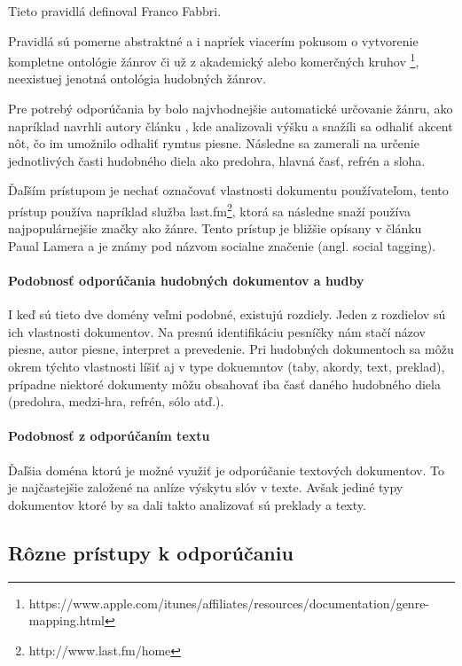Tieto pravidlá definoval Franco Fabbri\cite{music_genres_problematics}.

Pravidlá sú pomerne abstraktné a i napríek viacerím pokusom o vytvorenie
kompletne ontológie žánrov či už z akademický alebo komerčných kruhov
\footnote[2]{https://www.apple.com/itunes/affiliates/resources/documentation/genre-mapping.html},
neexistuej jenotná ontológia hudobných žánrov.

Pre potrebý odporúčania by bolo najvhodnejšie automatické určovanie žánru, ako napríklad 
navrhli autory článku \cite{automatic_genre_recognition}, kde analizovali výšku
a snažíli sa odhaliť akcent nôt, čo im umožnilo odhaliť rymtus piesne. Následne sa zamerali
na určenie jednotlivých časti hudobného diela ako predohra, hlavná časť, refrén a sloha.

Ďaľším prístupom je nechať označovať vlastnosti dokumentu používateľom, tento prístup
používa napríklad služba last.fm\footnote[3]{http://www.last.fm/home}, ktorá sa následne
snaží používa najpopulárnejšie značky ako žánre. Tento prístup je bližšie opísany v článku 
Paual Lamera\cite{social_tagging_music} a je známy pod názvom socialne značenie 
(angl. social tagging).

\paragraph{Podobnosť odporúčania hudobných dokumentov a hudby}

I keď sú tieto dve domény veľmi podobné, existujú rozdiely. Jeden z rozdielov sú ich vlastnosti 
dokumentov. Na presnú identifikáciu pesníčky nám stačí názov piesne, autor piesne, interpret a 
prevedenie. Pri hudobných dokumentoch sa môžu okrem týchto vlastnosti líšiť aj v type dokuemntov
(taby, akordy, text, preklad), prípadne niektoré dokumenty môžu obsahovať iba časť daného
hudobného diela (predohra, medzi-hra, refrén, sólo atď.).

\paragraph{Podobnosť z odporúčaním textu}

Ďaľšia doména ktorú je možné využiť je odporúčanie textových dokumentov. To je najčastejšie 
založené na anlíze výskytu slóv v texte. Avšak jediné typy dokumentov ktoré by sa 
dali takto analizovať sú preklady a texty.

\subsection{Rôzne prístupy k odporúčaniu}

